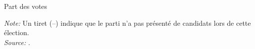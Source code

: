 \documentclass[xcolor=dvipsnames, aspectratio=169]{beamer}
\begin{document}
\begin{frame}{Part des votes}

\begin{table}[htbp]
\centering
\tiny   %
\caption{Part des votes moyens par parti et par année}

\label{tab:means_votes}

{\textit{Note:} Un tiret (--) indique que le parti n'a pas présenté de candidats lors de cette élection. \\
\textit{Source:} \cite{piketty_histoire_2023}.}

\end{table}

\end{frame}
\end{document}

